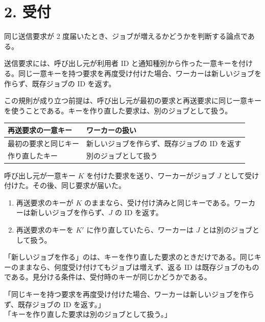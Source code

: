 \documentclass[10pt]{article}
\begin{document}
\tableofcontents

\section{2. 受付}
同じ送信要求が 2 度届いたとき、ジョブが増えるかどうかを判断する論点である。

\begin{youten}
送信要求には、呼び出し元が利用者 ID と通知種別から作った一意キーを付ける。同じ一意キーを持つ要求を再度受け付けた場合、ワーカーは新しいジョブを作らず、既存ジョブの ID を返す。

この規則が成り立つ前提は、呼び出し元が最初の要求と再送要求に同じ一意キーを使うことである。キーを作り直した要求は、別のジョブとして扱う。
\end{youten}

\begin{tabular}{L{0.36}L{0.54}}
\toprule
再送要求の一意キー & ワーカーの扱い \\
\midrule
最初の要求と同じキー & 新しいジョブを作らず、既存ジョブの ID を返す \\
作り直したキー & 別のジョブとして扱う \\
\bottomrule
\end{tabular}

\begin{reidai}
呼び出し元が一意キー $K$ を付けた要求を送り、ワーカーがジョブ $J$ として受け付けた。その後、同じ要求が届いた。
\begin{enumerate}
  \item 再送要求のキーが $K$ のままなら、受け付け済みと同じキーである。ワーカーは新しいジョブを作らず、$J$ の ID を返す。
  \item 再送要求のキーを $K'$ に作り直していたら、ワーカーは $J$ とは別のジョブとして扱う。
\end{enumerate}
\end{reidai}

\begin{mayoi}
「新しいジョブを作る」のは、キーを作り直した要求のときだけである。同じキーのままなら、何度受け付けてもジョブは増えず、返る ID は既存ジョブのものである。見分ける条件は、受付時のキーが同じかどうかである。
\end{mayoi}

\begin{genbun}
「同じキーを持つ要求を再度受け付けた場合、ワーカーは新しいジョブを作らず、既存ジョブの ID を返す。」\\
「キーを作り直した要求は別のジョブとして扱う。」
\end{genbun}
\end{document}
